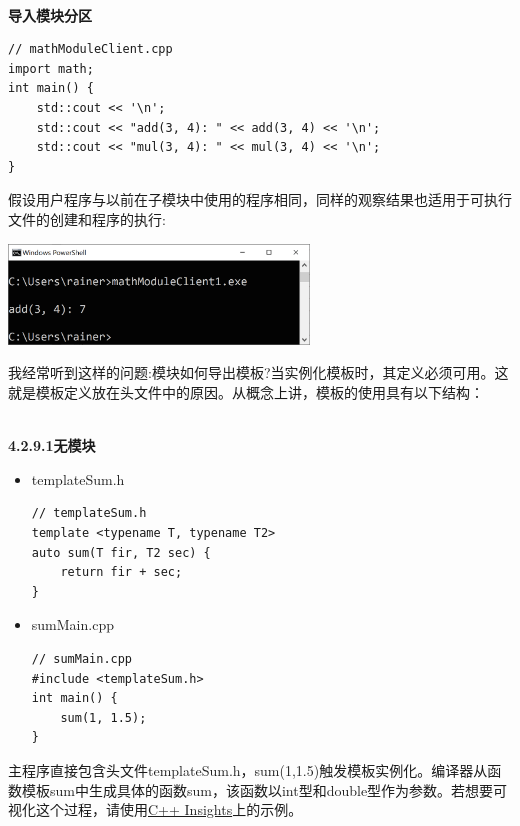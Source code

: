 \hspace*{\fill} \\ %
\noindent
\textbf{导入模块分区}
\begin{lstlisting}[style=styleCXX]
// mathModuleClient.cpp
import math;
int main() {
	std::cout << '\n';
	std::cout << "add(3, 4): " << add(3, 4) << '\n';
	std::cout << "mul(3, 4): " << mul(3, 4) << '\n';
}
\end{lstlisting}

假设用户程序与以前在子模块中使用的程序相同，同样的观察结果也适用于可执行文件的创建和程序的执行:

\begin{center}
\includegraphics[width=0.6\textwidth]{content/3/chapter4/images/23.png}\\
\end{center}


我经常听到这样的问题:模块如何导出模板?当实例化模板时，其定义必须可用。这就是模板定义放在头文件中的原因。从概念上讲，模板的使用具有以下结构：

\hspace*{\fill} \\ %
\noindent
\textbf{4.2.9.1\hspace{0.2cm}无模块}

\begin{itemize}
\item 
templateSum.h

\begin{lstlisting}[style=styleCXX]
// templateSum.h
template <typename T, typename T2>
auto sum(T fir, T2 sec) {
	return fir + sec;
}
\end{lstlisting}

\item 
sumMain.cpp

\begin{lstlisting}[style=styleCXX]
// sumMain.cpp
#include <templateSum.h>
int main() {
	sum(1, 1.5);
}
\end{lstlisting}
\end{itemize}

主程序直接包含头文件templateSum.h，sum(1,1.5)触发模板实例化。编译器从函数模板sum中生成具体的函数sum，该函数以int型和double型作为参数。若想要可视化这个过程，请使用\href{https://cppinsights.io/}{C++ Insights}上的示例。

